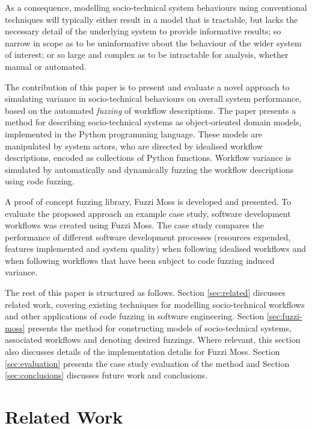 \documentclass{sig-alternate}
\begin{document}
As a consequence, modelling socio-technical system behaviours using conventional
techniques will typically either result in a model that is tractable, but lacks
the necessary detail of the underlying system to provide informative results; so
narrow in scope as to be uninformative about the behaviour of the wider system
of interest; or so large and complex as to be intractable for analysis, whether
manual or automated.

The contribution of this paper is to present and evaluate a novel approach to
simulating variance in socio-technical behaviours on overall system performance,
based on the automated \emph{fuzzing} of workflow descriptions.  The paper
presents a method for describing socio-technical systems as object-oriented
domain models, implemented in the Python programming language.  These models are
manipulated by system actors, who are directed by idealised workflow
descriptions, encoded as collections of Python functions.  Workflow variance is
simulated by automatically and dynamically fuzzing the workflow descriptions
using code fuzzing.

A proof of concept fuzzing library, Fuzzi Moss is developed and presented.  To
evaluate the proposed approach an example case study, software development
workflows was created using Fuzzi Moss.  The case study compares the
performance of different software development processes (resources
expended, features implemented and system quality) when following idealised
workflows and when following workflows that have been subject to code fuzzing
induced variance.

The rest of this paper is structured as follows.  Section \ref{sec:related}
discusses related work, covering existing techniques for modelling
socio-technical workflows and other applications of code fuzzing in software
engineering.  Section \ref{sec:fuzzi-moss} presents the method for constructing
models of socio-technical systems, associated workflows and denoting desired
fuzzings.  Where relevant, this section also discusses details of the
implementation detalis for Fuzzi Moss.  Section \ref{sec:evaluation} presents
the case study evaluation of the method and Section \ref{sec:conclusions}
discusses future work and conclusions.


\section{Related Work}
\end{document}
